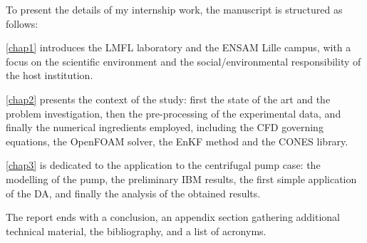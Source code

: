 
To present the details of my internship work, the manuscript is structured as follows:

\autoref{chap1} introduces the LMFL laboratory and the ENSAM Lille campus, with a focus on the scientific environment and the social/environmental 
responsibility of the host institution. 

\autoref{chap2} presents the context of the study: first the state of the art and the problem investigation, then the pre-processing of the experimental data, and finally the numerical ingredients employed, including the CFD governing equations, the OpenFOAM solver, the EnKF method and the CONES library. 

\autoref{chap3} is dedicated to the application to the centrifugal pump case: the modelling of the pump, the preliminary IBM results, the first simple application of the DA, and finally the analysis of the obtained results. 

The report ends with a conclusion, an appendix section gathering additional technical material, the bibliography, and a list of acronyms. 

